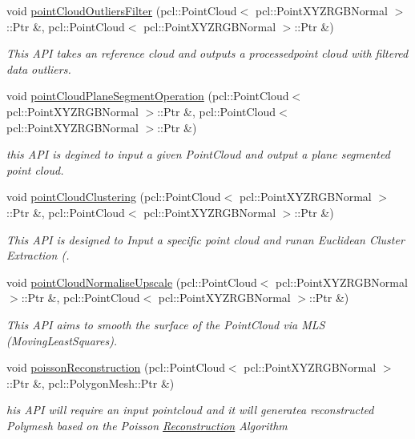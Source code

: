 \begin{DoxyCompactItemize}
void \hyperlink{classReconstruction_aab58cb52a7507ed64640c5e6645f296e}{point\+Cloud\+Outliers\+Filter} (pcl\+::\+Point\+Cloud$<$ pcl\+::\+Point\+X\+Y\+Z\+R\+G\+B\+Normal $>$\+::Ptr \&, pcl\+::\+Point\+Cloud$<$ pcl\+::\+Point\+X\+Y\+Z\+R\+G\+B\+Normal $>$\+::Ptr \&)
\begin{DoxyCompactList}\small\item\em This A\+PI takes an reference cloud and outputs a processedpoint cloud with filtered data outliers. \end{DoxyCompactList}\item 
void \hyperlink{classReconstruction_a1ea61518d67180a5d9d131d29a1b78c8}{point\+Cloud\+Plane\+Segment\+Operation} (pcl\+::\+Point\+Cloud$<$ pcl\+::\+Point\+X\+Y\+Z\+R\+G\+B\+Normal $>$\+::Ptr \&, pcl\+::\+Point\+Cloud$<$ pcl\+::\+Point\+X\+Y\+Z\+R\+G\+B\+Normal $>$\+::Ptr \&)
\begin{DoxyCompactList}\small\item\em this A\+PI is degined to input a given Point\+Cloud and output a plane segmented point cloud. \end{DoxyCompactList}\item 
void \hyperlink{classReconstruction_a9249ed4c0932b9fe460fada09ce38e67}{point\+Cloud\+Clustering} (pcl\+::\+Point\+Cloud$<$ pcl\+::\+Point\+X\+Y\+Z\+R\+G\+B\+Normal $>$\+::Ptr \&, pcl\+::\+Point\+Cloud$<$ pcl\+::\+Point\+X\+Y\+Z\+R\+G\+B\+Normal $>$\+::Ptr \&)
\begin{DoxyCompactList}\small\item\em This A\+PI is designed to Input a specific point cloud and runan Euclidean Cluster Extraction (. \end{DoxyCompactList}\item 
void \hyperlink{classReconstruction_ad5749b9529d6f026ae9bb1084f63b276}{point\+Cloud\+Normalise\+Upscale} (pcl\+::\+Point\+Cloud$<$ pcl\+::\+Point\+X\+Y\+Z\+R\+G\+B\+Normal $>$\+::Ptr \&, pcl\+::\+Point\+Cloud$<$ pcl\+::\+Point\+X\+Y\+Z\+R\+G\+B\+Normal $>$\+::Ptr \&)
\begin{DoxyCompactList}\small\item\em This A\+PI aims to smooth the surface of the Point\+Cloud via M\+LS (Moving\+Least\+Squares). \end{DoxyCompactList}\item 
void \hyperlink{classReconstruction_a42571b72e2c1ca984c259f3f4d319c75}{poisson\+Reconstruction} (pcl\+::\+Point\+Cloud$<$ pcl\+::\+Point\+X\+Y\+Z\+R\+G\+B\+Normal $>$\+::Ptr \&, pcl\+::\+Polygon\+Mesh\+::\+Ptr \&)
\begin{DoxyCompactList}\small\item\em his A\+PI will require an input pointcloud and it will generatea reconstructed Polymesh based on the Poisson \hyperlink{classReconstruction}{Reconstruction} Algorithm \end{DoxyCompactList}\item 

\end{DoxyCompactItemize}
